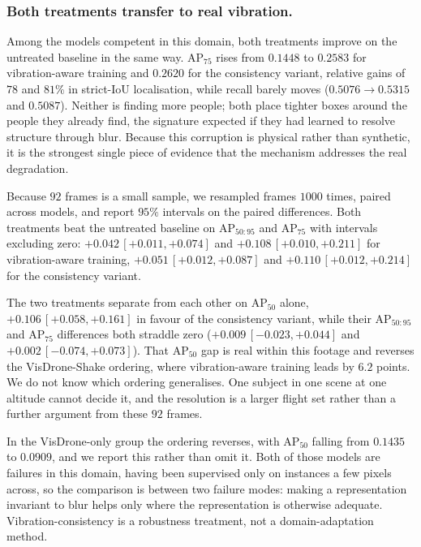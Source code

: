 \subsubsection{Both treatments transfer to real vibration.}
Among the models competent in this domain, both treatments improve on the untreated
baseline in the same way. AP$_{75}$ rises from $0.1448$ to $0.2583$ for
vibration-aware training and $0.2620$ for the consistency variant, relative gains of
$78$ and $81\%$ in strict-IoU localisation, while recall barely moves
($0.5076 \rightarrow 0.5315$ and $0.5087$). Neither is finding more people; both
place tighter boxes around the people they already find, the signature expected if
they had learned to resolve structure through blur. Because this corruption is
physical rather than synthetic, it is the strongest single piece of evidence that
the mechanism addresses the real degradation.

Because $92$ frames is a small sample, we resampled frames $1000$ times, paired
across models, and report $95\%$ intervals on the paired differences. Both
treatments beat the untreated baseline on AP$_{50:95}$ and AP$_{75}$ with intervals
excluding zero: $+0.042\,[+0.011, +0.074]$ and $+0.108\,[+0.010, +0.211]$ for
vibration-aware training, $+0.051\,[+0.012, +0.087]$ and
$+0.110\,[+0.012, +0.214]$ for the consistency variant.

The two treatments separate from each other on AP$_{50}$ alone,
$+0.106\,[+0.058, +0.161]$ in favour of the consistency variant, while their
AP$_{50:95}$ and AP$_{75}$ differences both straddle zero
($+0.009\,[-0.023, +0.044]$ and $+0.002\,[-0.074, +0.073]$). That AP$_{50}$ gap is
real within this footage and reverses the VisDrone-Shake ordering, where
vibration-aware training leads by $6.2$ points. We do not know which ordering
generalises. One subject in one scene at one altitude cannot decide it, and the
resolution is a larger flight set rather than a further argument from these
$92$ frames.

In the VisDrone-only group the ordering reverses, with AP$_{50}$ falling from $0.1435$
to $0.0909$, and we report this rather than omit it. Both of those models are failures
in this domain, having been supervised only on instances a few pixels across, so the
comparison is between two failure modes: making a representation invariant to blur
helps only where the representation is otherwise adequate. Vibration-consistency is a
robustness treatment, not a domain-adaptation method.

